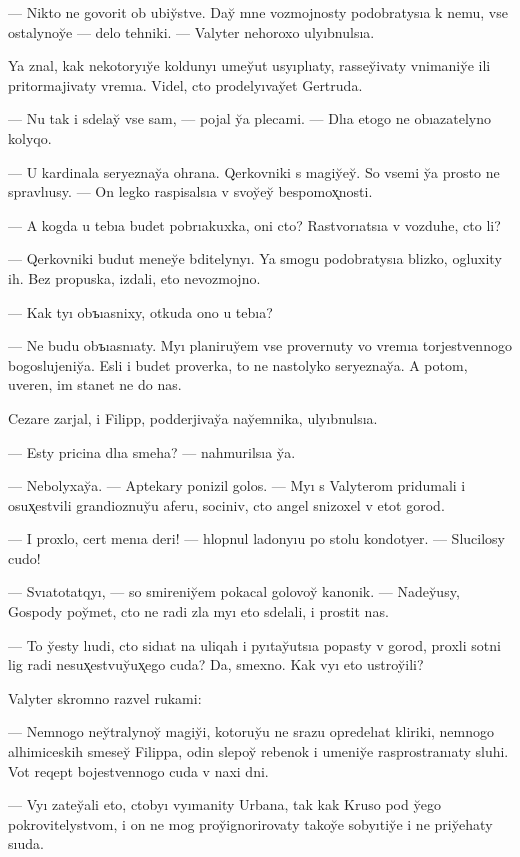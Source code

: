 \documentclass[10pt]{book}
\begin{document}
— Nikto ne govorit ob ubiy̆stve. Day̆ mne vozmojnosty podobratysıa k nemu, vse ostalynoy̆e — delo tehniki. — Valyter nehoroxo ulyıbnulsıa.

Ya znal, kak nekotoryıy̆e koldunyı umey̆ut usyıplıaty, rassey̆ivaty vnimaniy̆e ili pritormajivaty vremıa. Videl, cto prodelyıvay̆et Gertruda.

— Nu tak i sdelay̆ vse sam, — pojal y̆a plecami. — Dlıa etogo ne obıazatelyno kolyqo.

— U kardinala seryeznay̆a ohrana. Qerkovniki s magiy̆ey̆. So vsemi y̆a prosto ne spravlıusy. — On legko raspisalsıa v svoy̆ey̆ bespomox̨nosti.

— A kogda u tebıa budet pobrıakuxka, oni cto? Rastvorıatsıa v vozduhe, cto li?

— Qerkovniki budut meney̆e bditelynyı. Ya smogu podobratysıa blizko, ogluxity ih. Bez propuska, izdali, eto nevozmojno.

— Kak tyı obъıasnixy, otkuda ono u tebıa?

— Ne budu obъıasnıaty. Myı planiruy̆em vse provernuty vo vremıa torjestvennogo bogoslujeniy̆a. Esli i budet proverka, to ne nastolyko seryeznay̆a. A potom, uveren, im stanet ne do nas.

Cezare zarjal, i Filipp, podderjivay̆a nay̆emnika, ulyıbnulsıa.

— Esty pricina dlıa smeha? — nahmurilsıa y̆a.

— Nebolyxay̆a. — Aptekary ponizil golos. — Myı s Valyterom pridumali i osux̨estvili grandioznuy̆u aferu, sociniv, cto angel snizoxel v etot gorod.

— I proxlo, cert menıa deri! — hlopnul ladonyıu po stolu kondotyer. — Slucilosy cudo!

— Svıatotatqyı, — so smireniy̆em pokacal golovoy̆ kanonik. — Nadey̆usy, Gospody poy̆met, cto ne radi zla myı eto sdelali, i prostit nas.

— To y̆esty lıudi, cto sidıat na uliqah i pyıtay̆utsıa popasty v gorod, proxli sotni lig radi nesux̨estvuy̆ux̨ego cuda? Da, smexno. Kak vyı eto ustroy̆ili?

Valyter skromno razvel rukami:

— Nemnogo ney̆tralynoy̆ magiy̆i, kotoruy̆u ne srazu opredelıat kliriki, nemnogo alhimiceskih smesey̆ Filippa, odin slepoy̆ rebenok i umeniy̆e rasprostranıaty sluhi. Vot reqept bojestvennogo cuda v naxi dni.

— Vyı zatey̆ali eto, ctobyı vyımanity Urbana, tak kak Kruso pod y̆ego pokrovitelystvom, i on ne mog proy̆ignorirovaty takoy̆e sobyıtiy̆e i ne priy̆ehaty sıuda.
\end{document}
